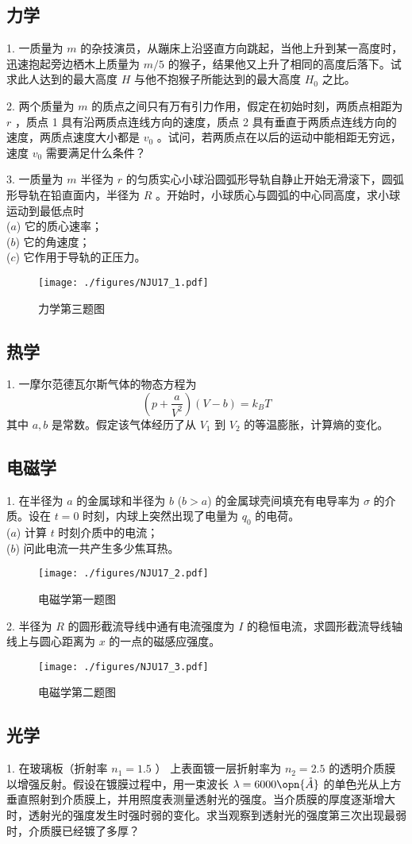 \subsection{力学}
1. 一质量为 $m$ 的杂技演员，从蹦床上沿竖直方向跳起，当他上升到某一高度时，迅速抱起旁边栖木上质量为 $m/5$ 的猴子，结果他又上升了相同的高度后落下。试求此人达到的最大高度 $H$ 与他不抱猴子所能达到的最大高度 $H_{0}$ 之比。

2. 两个质量为 $m$ 的质点之间只有万有引力作用，假定在初始时刻，两质点相距为 $r$ ，质点 1 具有沿两质点连线方向的速度，质点 2 具有垂直于两质点连线方向的速度，两质点速度大小都是 $v_{0}$ 。试问，若两质点在以后的运动中能相距无穷远，速度 $v_0$ 需要满足什么条件？

3. 一质量为 $m$ 半径为 $r$ 的匀质实心小球沿圆弧形导轨自静止开始无滑滚下，圆弧形导轨在铅直面内，半径为 $R$ 。开始时，小球质心与圆弧的中心同高度，求小球运动到最低点时\\ 
($a$) 它的质心速率；\\
($b$) 它的角速度；\\
($c$) 它作用于导轨的正压力。
\begin{figure}[ht]
\centering
\texttt{[image: ./figures/NJU17\_1.pdf]}
\caption{力学第三题图} \label{NJU17_fig1}
\end{figure}
\subsection{热学}
1. 一摩尔范德瓦尔斯气体的物态方程为 
\begin{equation}
\left(p+\frac{a}{V^{2}}\right)(V-b)=k_{B} T
\end{equation}
其中 $a, b$ 是常数。假定该气体经历了从 $V_{1}$ 到 $V_{2}$ 的等温膨胀，计算熵的变化。
\subsection{电磁学}
1. 在半径为 $a$ 的金属球和半径为 $b$ ($b>a$) 的金属球壳间填充有电导率为 $\sigma$ 的介质。设在 $t=0$ 时刻，内球上突然出现了电量为 $q_0$ 的电荷。\\
($a$) 计算 $t$ 时刻介质中的电流；\\
($b$) 问此电流一共产生多少焦耳热。
\begin{figure}[ht]
\centering
\texttt{[image: ./figures/NJU17\_2.pdf]}
\caption{电磁学第一题图} \label{NJU17_fig2}
\end{figure}
2. 半径为 $R$ 的圆形截流导线中通有电流强度为 $I$ 的稳恒电流，求圆形截流导线轴线上与圆心距离为 $x$ 的一点的磁感应强度。
\begin{figure}[ht]
\centering
\texttt{[image: ./figures/NJU17\_3.pdf]}
\caption{电磁学第二题图} \label{NJU17_fig3}
\end{figure}
\subsection{光学}
1. 在玻璃板（折射率 $n_{1}=1.5$ ） 上表面镀一层折射率为 $n_{2}=2.5$ 的透明介质膜以增强反射。假设在镀膜过程中，用一束波长 $\lambda=6000 \opn{\mathring{A}}$ 的单色光从上方垂直照射到介质膜上，并用照度表测量透射光的强度。当介质膜的厚度逐渐增大时，透射光的强度发生时强时弱的变化。求当观察到透射光的强度第三次出现最弱时，介质膜已经镀了多厚？